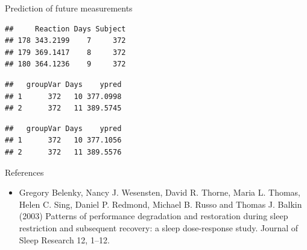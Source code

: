 \begin{frame}[fragile]{Prediction of future measurements}
\protect\hypertarget{prediction-of-future-measurements}{}

\scriptsize

\begin{Shaded}
\begin{Highlighting}[]
\NormalTok{)}
\end{Highlighting}
\end{Shaded}

\begin{verbatim}
##     Reaction Days Subject
## 178 343.2199    7     372
## 179 369.1417    8     372
## 180 364.1236    9     372
\end{verbatim}

\begin{Shaded}
\begin{Highlighting}[]
\StringTok{ }\NormalTok{(}\NormalTok{,}\OperatorTok{:}\NormalTok{,}\NormalTok{)}
\end{Highlighting}
\end{Shaded}

\begin{verbatim}
##   groupVar Days    ypred
## 1      372   10 377.0998
## 2      372   11 389.5745
\end{verbatim}

\begin{Shaded}
\begin{Highlighting}[]
\end{Highlighting}
\end{Shaded}

\begin{verbatim}
##   groupVar Days    ypred
## 1      372   10 377.1056
## 2      372   11 389.5576
\end{verbatim}

\end{frame}

\begin{frame}{References}
\protect\hypertarget{references}{}

\begin{itemize}
\tightlist
\item
  Gregory Belenky, Nancy J. Wesensten, David R. Thorne, Maria L. Thomas,
  Helen C. Sing, Daniel P. Redmond, Michael B. Russo and Thomas J.
  Balkin (2003) Patterns of performance degradation and restoration
  during sleep restriction and subsequent recovery: a sleep
  dose-response study. Journal of Sleep Research 12, 1--12.
\end{itemize}

\end{frame}
